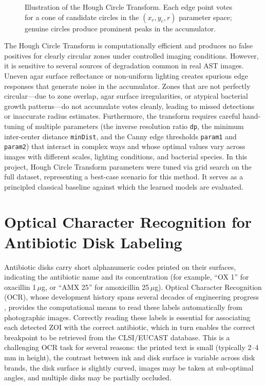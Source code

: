 \begin{figure}[H]
  \centering
  \caption{Illustration of the Hough Circle Transform. Each edge point votes for a cone of
    candidate circles in the $(x_c, y_c, r)$ parameter space; genuine circles produce
    prominent peaks in the accumulator.}
  \label{fig:hough}
\end{figure}

The Hough Circle Transform is computationally efficient and produces no false positives for
clearly circular zones under controlled imaging conditions. However, it is sensitive to several
sources of degradation common in real AST images. Uneven agar surface reflectance or non-uniform
lighting creates spurious edge responses that generate noise in the accumulator. Zones that
are not perfectly circular---due to zone overlap, agar surface irregularities, or atypical
bacterial growth patterns---do not accumulate votes cleanly, leading to missed detections or
inaccurate radius estimates. Furthermore, the transform requires careful hand-tuning of multiple
parameters (the inverse resolution ratio \texttt{dp}, the minimum inter-center distance
\texttt{minDist}, and the Canny edge thresholds \texttt{param1} and \texttt{param2}) that
interact in complex ways and whose optimal values vary across images with different scales,
lighting conditions, and bacterial species. In this project, Hough Circle Transform parameters
were tuned via grid search on the full dataset, representing a best-case scenario for this
method. It serves as a principled classical baseline against which the learned models are evaluated.

\section{Optical Character Recognition for Antibiotic Disk Labeling}

Antibiotic disks carry short alphanumeric codes printed on their surfaces, indicating the
antibiotic name and its concentration (for example, ``OX 1'' for oxacillin 1\,$\mu$g, or
``AMX 25'' for amoxicillin 25\,$\mu$g). Optical Character Recognition (OCR), whose development
history spans several decades of engineering progress \cite{wang2023ocr_history}, provides the
computational means to read these labels automatically from photographic images. Correctly
reading these labels is essential for associating each detected ZOI with the correct antibiotic,
which in turn enables the correct breakpoint to be retrieved from the CLSI/EUCAST database.
This is a challenging OCR task for several reasons: the printed text is small (typically 2--4 mm
in height), the contrast between ink and disk surface is variable across disk brands, the disk
surface is slightly curved, images may be taken at sub-optimal angles, and multiple disks may
be partially occluded.

